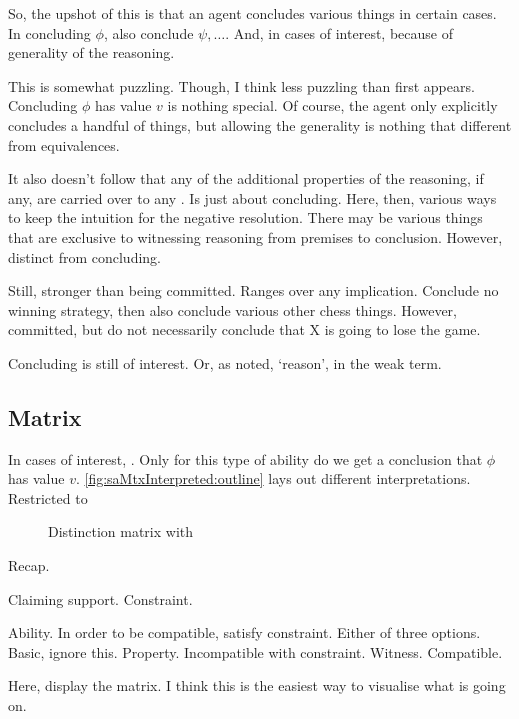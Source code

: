 \begin{note}[Terminology]
  So, the upshot of this is that an agent concludes various things in certain cases.
  In concluding \(\phi\), also conclude \(\psi,\dots\).
  And, in cases of interest, because of generality of the reasoning.

  This is somewhat puzzling.
  Though, I think less puzzling than first appears.
  Concluding \(\phi\) has value \(v\) is nothing special.
  Of course, the agent only explicitly concludes a handful of things, but allowing the generality is nothing that different from equivalences.

  It also doesn't follow that any of the additional properties of the reasoning, if any, are carried over to any .
  Is just about concluding.
  Here, then, various ways to keep the intuition for the negative resolution.
  There may be various things that are exclusive to witnessing reasoning from premises to conclusion.
  However, distinct from concluding.

  Still, stronger than being committed.
  Ranges over any implication.
  Conclude no winning strategy, then also conclude various other chess things.
  However, committed, but do not necessarily conclude that X is going to lose the game.

  Concluding is still of interest.
  Or, as noted, `reason', in the weak term.
\end{note}

\subsection{Matrix}

\begin{note}
  In cases of interest, .
  Only for this type of ability do we get a conclusion that \(\phi\) has value \(v\).
  \autoref{fig:saMtxInterpreted:outline} lays out different interpretations.
  Restricted to \adB{}
\end{note}

\begin{note}
  \begin{figure}[H]
    \centering
    \saMtxInterpreted{}
    \caption{Distinction matrix with }
    \label{fig:saMtxInterpreted:outline}
  \end{figure}
\end{note}

\begin{note}
  Recap.

  Claiming support.
  Constraint.

  Ability.
  In order to be compatible, satisfy constraint.
  Either of three options.
  Basic, ignore this.
  Property. Incompatible with constraint.
  Witness. Compatible.

  Here, display the matrix.
  I think this is the easiest way to visualise what is going on.
\end{note}


